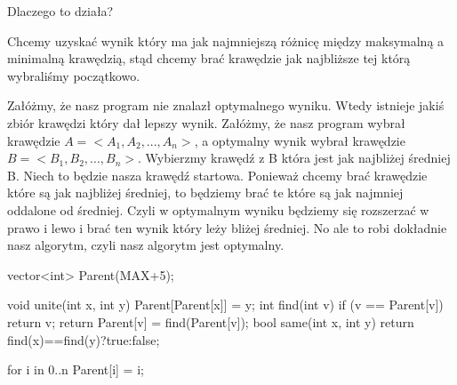 \documentclass[12pt]{article}
\begin{document}
Dlaczego to działa?

Chcemy uzyskać wynik który ma jak najmniejszą różnicę między maksymalną a minimalną krawędzią, stąd chcemy brać krawędzie jak najbliższe tej którą wybraliśmy początkowo.

Załóżmy, że nasz program nie znalazł optymalnego wyniku.
Wtedy istnieje jakiś zbiór krawędzi który dał lepszy wynik.
Załóżmy, że nasz program wybrał krawędzie $A = <A_1, A_2, ..., A_n>$, a optymalny wynik wybrał krawędzie $B = <B_1, B_2, ..., B_n>$.
Wybierzmy krawędź z B która jest jak najbliżej średniej B.
Niech to będzie nasza krawędź startowa. 
Ponieważ chcemy brać krawędzie które są jak najbliżej średniej, to będziemy brać te które są jak najmniej oddalone od średniej. Czyli w optymalnym wyniku będziemy się rozszerzać w prawo i lewo i brać ten wynik który leży bliżej średniej.
No ale to robi dokładnie nasz algorytm, czyli nasz algorytm jest optymalny.




vector<int> Parent(MAX+5);
 
void unite(int x, int y){
	Parent[Parent[x]] = y;
}
int find(int v){
	if (v == Parent[v])
        return v;
    return Parent[v] = find(Parent[v]);
}
bool same(int x, int y){
	return find(x)==find(y)?true:false;
}

for i in 0..n{
    Parent[i] = i;
}
\end{document}
